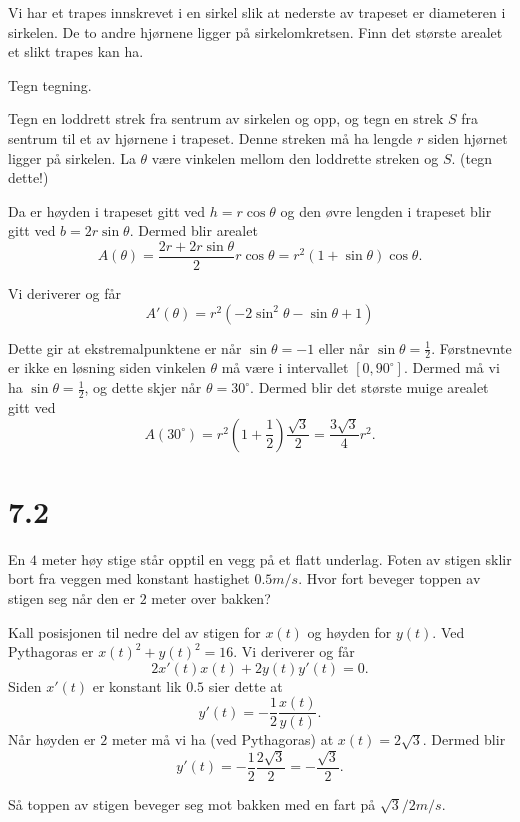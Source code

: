 \documentclass[11pt, norsk]{article}
\begin{document}
\begin{oppg}[7.1.15]
Vi har et trapes innskrevet i en sirkel slik at nederste av trapeset er diameteren i sirkelen. De to andre hjørnene ligger på sirkelomkretsen. Finn det største arealet et slikt trapes kan ha.
\end{oppg}
\begin{losn}
Tegn tegning.

Tegn en loddrett strek fra sentrum av sirkelen og opp, og tegn en strek $S$ fra sentrum til et av hjørnene i trapeset. Denne streken må ha lengde $r$ siden hjørnet ligger på sirkelen. La $\theta$ være vinkelen mellom den loddrette streken og $S$. (tegn dette!)

Da er høyden i trapeset gitt ved $h=r \cos \theta$ og den øvre lengden i trapeset blir gitt ved $b=2r \sin \theta$. Dermed blir arealet
$$
A(\theta) = \frac{2r+2r\sin \theta}{2} r \cos \theta = r^2(1+ \sin \theta) \cos \theta.
$$

Vi deriverer og får
$$
A'(\theta) = r^2(-2\sin^2 \theta - \sin \theta + 1)
$$

Dette gir at ekstremalpunktene er når $\sin \theta = -1$ eller når $\sin \theta = \frac 12$. Førstnevnte er ikke en løsning siden vinkelen $\theta$ må være i intervallet $[0,90^\circ]$. Dermed må vi ha $\sin \theta = \frac 12$, og dette skjer når $\theta = 30^\circ$. Dermed blir det største muige arealet gitt ved 
$$
A(30^\circ) = r^2(1+\frac 12) \frac{\sqrt 3}{2} = \frac{3 \sqrt 3}{4} r^2.
$$
\end{losn}


\section{7.2}

\begin{oppg}[7.2.1]
En $4$ meter høy stige står opptil en vegg på et flatt underlag. Foten av stigen sklir bort fra veggen med konstant hastighet $0.5 m/s$. Hvor fort beveger toppen av stigen seg når den er $2$ meter over bakken?
\end{oppg}

\begin{losn}
Kall posisjonen til nedre del av stigen for $x(t)$ og høyden for $y(t)$. Ved Pythagoras er $x(t)^2+y(t)^2=16$. Vi deriverer og får
$$
2x'(t)x(t) +2y(t)y'(t)=0.
$$
Siden $x'(t)$ er konstant lik $0.5$ sier dette at 
$$
y'(t) = -\frac 12 \frac{x(t)}{y(t)}.
$$
Når høyden er $2$ meter må vi ha (ved Pythagoras) at $x(t) = 2 \sqrt{3}$. Dermed blir
$$
y'(t) = -\frac 12 \frac{2 \sqrt{3}}{2}= - \frac{\sqrt{3}}{2}.
$$

Så toppen av stigen beveger seg mot bakken med en fart på $\sqrt 3 / 2 m/s$. 
\end{losn}
\end{document}
